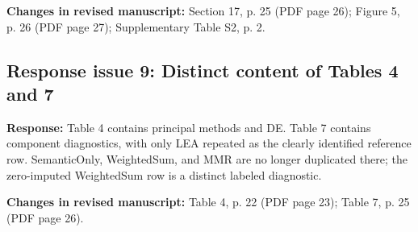 \documentclass[11pt,a4paper]{article}
\begin{document}
\textbf{Changes in revised manuscript:} Section 17, p. 25 (PDF page 26); Figure 5, p. 26 (PDF page 27); Supplementary Table S2, p. 2.

\subsection*{Response issue 9: Distinct content of Tables 4 and 7}
\textbf{Response:} Table 4 contains principal methods and DE. Table 7 contains component diagnostics, with only LEA repeated as the clearly identified reference row. SemanticOnly, WeightedSum, and MMR are no longer duplicated there; the zero-imputed WeightedSum row is a distinct labeled diagnostic.

\textbf{Changes in revised manuscript:} Table 4, p. 22 (PDF page 23); Table 7, p. 25 (PDF page 26).
\end{document}
